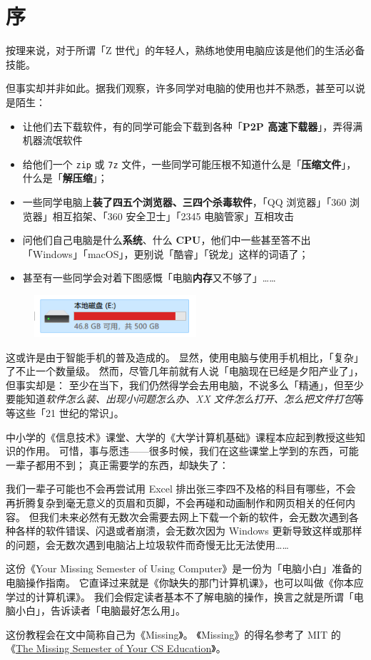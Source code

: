 \chapter{序}

按理来说，对于所谓「Z 世代」的年轻人，熟练地使用电脑应该是他们的生活必备技能。

但事实却并非如此。据我们观察，许多同学对电脑的使用也并不熟悉，甚至可以说是陌生：

\begin{itemize}
  \item 让他们去下载软件，有的同学可能会下载到各种「\textbf{P2P 高速下载器}」，弄得满机器流氓软件
  \item 给他们一个 \texttt{zip} 或 \texttt{7z} 文件，一些同学可能压根不知道什么是「\textbf{压缩文件}」，什么是「\textbf{解压缩}」；
  \item 一些同学电脑上\textbf{装了四五个浏览器、三四个杀毒软件}，「QQ 浏览器」「360 浏览器」相互掐架、「360 安全卫士」「2345 电脑管家」互相攻击
  \item 问他们自己电脑是什么\textbf{系统}、什么 \textbf{CPU}，他们中一些甚至答不出「Windows」「macOS」，更别说「酷睿」「锐龙」这样的词语了；
  \item 甚至有一些同学会对着下图感慨「电脑\textbf{内存}又不够了」……
\end{itemize}

\begin{figure}[htb!]
  \centering
  \includegraphics[width=6cm]{assets/Storage_Shortage.png}
\end{figure}

这或许是由于智能手机的普及造成的。
显然，使用电脑与使用手机相比，「复杂」了不止一个数量级。
然而，尽管几年前就有人说「电脑现在已经是夕阳产业了」，但事实却是：
至少在当下，我们仍然得学会去用电脑，不说多么「精通」，但至少要能知道\textit{软件怎么装、出现小问题怎么办、XX 文件怎么打开、怎么把文件打包}等等这些「21 世纪的常识」。

中小学的《信息技术》课堂、大学的《大学计算机基础》课程本应起到教授这些知识的作用。
可惜，事与愿违——很多时候，我们在这些课堂上学到的东西，可能一辈子都用不到；
真正需要学的东西，却缺失了：

我们一辈子可能也不会再尝试用 Excel 排出张三李四不及格的科目有哪些，不会再折腾复杂到毫无意义的页眉和页脚，不会再碰和动画制作和网页相关的任何内容。
但我们未来必然有无数次会需要去网上下载一个新的软件，会无数次遇到各种各样的软件错误、闪退或者崩溃，会无数次因为 Windows 更新导致这样或那样的问题，会无数次遇到电脑沾上垃圾软件而奇慢无比无法使用……

这份《Your Missing Semester of Using Computer》是一份为「电脑小白」准备的电脑操作指南。
它直译过来就是《你缺失的那门计算机课》，也可以叫做《你本应学过的计算机课》。
我们会假定读者基本不了解电脑的操作，换言之就是所谓「电脑小白」，告诉读者「电脑最好怎么用」。

这份教程会在文中简称自己为《Missing》。
《Missing》的得名参考了 MIT 的《\href{https://missing.csail.mit.edu/}{The Missing Semester of Your CS Education}》。